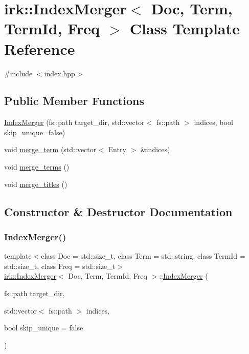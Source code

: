 \hypertarget{classirk_1_1IndexMerger}{}\section{irk\+:\+:Index\+Merger$<$ Doc, Term, Term\+Id, Freq $>$ Class Template Reference}
\label{classirk_1_1IndexMerger}


{\ttfamily \#include $<$index.\+hpp$>$}

\subsection*{Public Member Functions}
\begin{DoxyCompactItemize}
\item 
\mbox{\hyperlink{classirk_1_1IndexMerger_a577e884b2ad8f3e32d212a8c6e1cba09}{Index\+Merger}} (fs\+::path target\+\_\+dir, std\+::vector$<$ fs\+::path $>$ indices, bool skip\+\_\+unique=false)
\item 
void \mbox{\hyperlink{classirk_1_1IndexMerger_a1865c7874639241811f470992fe273f3}{merge\+\_\+term}} (std\+::vector$<$ Entry $>$ \&indices)
\item 
void \mbox{\hyperlink{classirk_1_1IndexMerger_a12b9f745661a19f26d80622d59844b5c}{merge\+\_\+terms}} ()
\item 
void \mbox{\hyperlink{classirk_1_1IndexMerger_a634ac691cb16b2feea59de10a11e80da}{merge\+\_\+titles}} ()
\end{DoxyCompactItemize}


\subsection{Constructor \& Destructor Documentation}
\mbox{\label{classirk_1_1IndexMerger_a577e884b2ad8f3e32d212a8c6e1cba09}} 
\subsubsection{\texorpdfstring{Index\+Merger()}{IndexMerger()}}
{\footnotesize\ttfamily template$<$class Doc  = std\+::size\+\_\+t, class Term  = std\+::string, class Term\+Id  = std\+::size\+\_\+t, class Freq  = std\+::size\+\_\+t$>$ \\
\mbox{\hyperlink{classirk_1_1IndexMerger}{irk\+::\+Index\+Merger}}$<$ Doc, Term, Term\+Id, Freq $>$\+::\mbox{\hyperlink{classirk_1_1IndexMerger}{Index\+Merger}} (\begin{DoxyParamCaption}\item[{fs\+::path}]{target\+\_\+dir,  }\item[{std\+::vector$<$ fs\+::path $>$}]{indices,  }\item[{bool}]{skip\+\_\+unique = {\ttfamily false} }\end{DoxyParamCaption})\hspace{0.3cm}{\ttfamily [inline]}}



